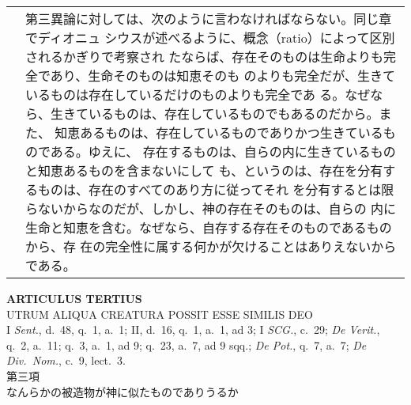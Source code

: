 \documentclass[10pt]{jsarticle}
\begin{document}
\begin{longtable}{p{21em}p{21em}}
&

第三異論に対しては、次のように言わなければならない。同じ章でディオニュ
シウスが述べるように、概念（ratio）によって区別されるかぎりで考察され
たならば、存在そのものは生命よりも完全であり、生命そのものは知恵そのも
のよりも完全だが、生きているものは存在しているだけのものよりも完全であ
る。なぜなら、生きているものは、存在しているものでもあるのだから。また、
知恵あるものは、存在しているものでありかつ生きているものである。ゆえに、
存在するものは、自らの内に生きているものと知恵あるものを含まないにして
も、というのは、存在を分有するものは、存在のすべてのあり方に従ってそれ
を分有するとは限らないからなのだが、しかし、神の存在そのものは、自らの
内に生命と知恵を含む。なぜなら、自存する存在そのものであるものから、存
在の完全性に属する何かが欠けることはありえないからである。


\end{longtable}

\newpage
{}

\begin{center}
 {\Large {\bf ARTICULUS TERTIUS}}\\
 {\large UTRUM ALIQUA CREATURA POSSIT ESSE SIMILIS DEO}\\
 {\footnotesize I {\itshape Sent.}, d.~48, q.~1, a.~1; II, d.~16, q.~1,
 a.~1, ad 3; I {\itshape SCG.}, c.~29; {\itshape De Verit.}, q.~2,
 a.~11; q.~3, a.~1, ad 9; q.~23, a.~7, ad 9 sqq.; {\itshape De Pot.},
 q.~7, a.~7; {\itshape De Div.~Nom.}, c.~9, lect.~3.}\\
 {\Large 第三項\\なんらかの被造物が神に似たものでありうるか }
\end{center}
\end{document}
